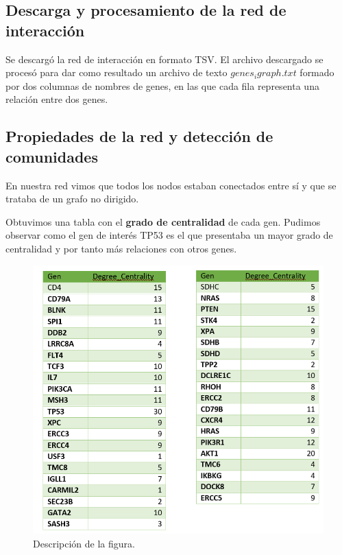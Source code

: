 \subsection{Descarga y procesamiento de la red de interacción}

Se descargó la red de interacción en formato TSV. El archivo descargado se procesó para dar como resultado un archivo de texto \textbf{$genes_igraph.txt$} formado por dos columnas de nombres de genes, en las que cada fila representa una relación entre dos genes.



\subsection{Propiedades de la red y detección de comunidades}

En nuestra red vimos que todos los nodos estaban conectados entre sí y que se trataba de un grafo no dirigido.

\vspace{3pt}

Obtuvimos una tabla con el \textbf{grado de centralidad} de cada gen. Pudimos observar como el gen de interés TP53 es el que presentaba un mayor grado de centralidad y por tanto más relaciones con otros genes. 
\begin{figure}
	\centering
	\includegraphics[width=0.8\linewidth]{figures/grado_centralidad}
	\caption{Descripción de la figura.}
	\label{fig:grado_centralidad}
\end{figure}


\vspace{3pt}

